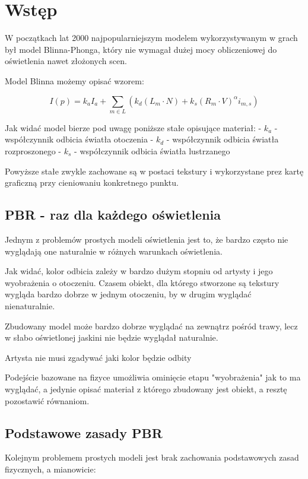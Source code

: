 \documentclass[../main.tex]{subfiles}
\begin{document}
\section{Wstęp}

W początkach lat 2000 najpopularniejszym modelem wykorzystywanym w grach był
model Blinna-Phonga, który nie wymagał dużej mocy obliczeniowej do oświetlenia
nawet złożonych scen.

Model Blinna możemy opisać wzorem:

$$
I(p) = k_a I_a + \sum_{m \in L} \left( {
    k_d (L_m \cdot N) +
    k_s (R_m \cdot V)^{\alpha} i_{m,s}
} \right)
$$

Jak widać model bierze pod uwagę poniższe stałe opisujące materiał:
- $k_a$ - współczynnik odbicia światła otoczenia
- $k_d$ - współczynnik odbicia światła rozproszonego
- $k_s$ - współczynnik odbicia światła lustrzanego

Powyższe stałe zwykle zachowane są w postaci tekstury i wykorzystane prez kartę
graficzną przy cieniowaniu konkretnego punktu.

\subsection{PBR - raz dla każdego oświetlenia}

Jednym z problemów prostych modeli oświetlenia jest to, że bardzo często nie
wyglądają one naturalnie w różnych warunkach oświetlenia.

Jak widać, kolor odbicia zależy w bardzo dużym stopniu od artysty i jego
wyobrażenia o otoczeniu. Czasem obiekt, dla którego stworzone są tekstury
wygląda bardzo dobrze w jednym otoczeniu, by w drugim wyglądać nienaturalnie.

Zbudowany model może bardzo dobrze wyglądać na zewnątrz pośród trawy, lecz
w słabo oświetlonej jaskini nie  będzie wyglądał naturalnie.

Artysta nie musi zgadywać jaki kolor będzie odbity

Podejście bazowane na fizyce umożliwia ominięcie etapu "wyobrażenia" jak to ma
wyglądać, a jedynie opisać materiał z którego zbudowany jest obiekt, a resztę
pozostawić równaniom.

\subsection{Podstawowe zasady PBR}

Kolejnym problemem prostych modeli jest brak zachowania podstawowych zasad
fizycznych, a mianowicie:
\end{document}

